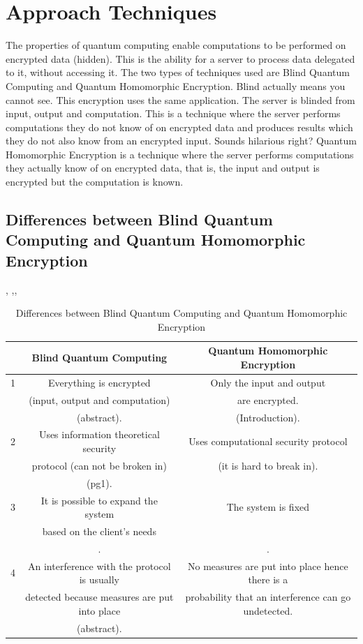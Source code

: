 \section{Approach Techniques}
The properties of quantum computing enable computations to be performed on encrypted data (hidden).
This is the ability for a server to process data delegated to it, without accessing it. 
The two types of techniques used are Blind Quantum Computing and Quantum Homomorphic Encryption.
Blind actually means you cannot see. This encryption uses the same application. The server is blinded from input, output and computation. This is a technique where the server performs computations they do not know of on encrypted data and produces results which they do not also know from an encrypted input. Sounds hilarious right?
Quantum Homomorphic Encryption is a technique where the server performs computations they actually know of on encrypted data, that is, the input and output is encrypted but the computation is known.

\subsection{Differences between Blind Quantum Computing and Quantum Homomorphic Encryption}

\citep{broadbent2009universal}, \citep{fitzsimons2017private},\cite{ouyang2015quantum},\citep{Joe}

\begin{table}[!h]

\begin{tabular}{|c| c| c|}
\hline
 & Blind Quantum Computing & Quantum Homomorphic Encryption\\
\hline
1 & Everything is encrypted &   Only the input and output\\ 
 & (input, output and computation) &  are encrypted.\\
 &\citep{huang2017experimental} (abstract). &  \citep{broadbent2015quantum} (Introduction).\\
\hline
2 & Uses information theoretical security & Uses computational security protocol\\
  & protocol (can not be broken in) & (it is hard to break in).\\
  & \citep{fitzsimons2017private} (pg1).&  \\
\hline
3 & It is possible to expand the system & The system is fixed \\
& based on the client's needs &  \\
& \citep{Joe}.& \citep{Joe}.\\
\hline
4 & An interference with the protocol is usually & No measures are put into place hence there is a \\
  & detected because measures are put into place &  probability that an interference can go undetected.\\
  & \citep{broadbent2009universal}(abstract). & \\
\hline  
\end{tabular}
\caption{Differences between Blind Quantum Computing and Quantum Homomorphic Encryption }
\label{fig:table1}
\end{table}

